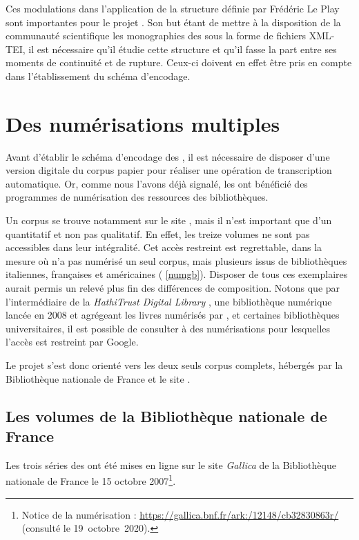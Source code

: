 Ces modulations dans l'application de la structure définie par Frédéric Le Play sont importantes pour le projet \timeus. Son but étant de mettre à la disposition de la communauté scientifique les monographies des \odm{} sous la forme de fichiers XML-TEI, il est nécessaire qu'il étudie cette structure et qu'il fasse la part entre ses moments de continuité et de rupture. Ceux-ci doivent en effet être pris en compte dans l'établissement du schéma d'encodage.

\newpage
\thispagestyle{empty}
\mbox{}
\newpage

\chapter{Des numérisations multiples}

Avant d'établir le schéma d'encodage des \odm, il est nécessaire de disposer d'une version digitale du corpus \og papier \fg{} pour réaliser une opération de transcription automatique. Or, comme nous l'avons déjà signalé, les \odm{} ont bénéficié des programmes de numérisation des ressources des bibliothèques.

Un corpus se trouve notamment sur le site \gb, mais il n'est important que d'un \pov{} quantitatif et non pas qualitatif. En effet, les treize volumes ne sont pas accessibles dans leur intégralité. Cet accès restreint est regrettable, dans la mesure où \gb{} n'a pas numérisé un seul corpus, mais plusieurs issus de bibliothèques italiennes, françaises et américaines (\ann{} \ref{numgb}). Disposer de tous ces exemplaires aurait permis un relevé plus fin des différences de composition. Notons que par l'intermédiaire de la \textit{HathiTrust Digital Library }, une bibliothèque numérique lancée en 2008 et agrégeant les livres numérisés par \gb, \ia{} et certaines bibliothèques universitaires, il est possible de consulter à des numérisations pour lesquelles l'accès est restreint par Google.

Le projet \timeus{} s'est donc orienté vers les deux seuls corpus complets, hébergés par la Bibliothèque nationale de France et le site \ia.

\section{Les volumes de la Bibliothèque nationale de France}

Les trois séries des \odm{} ont été mises en ligne sur le site \textit{Gallica} de la Bibliothèque nationale de France le 15 octobre 2007\footnote{Notice de la numérisation : \url{https://gallica.bnf.fr/ark:/12148/cb32830863r/} (consulté le 19~octobre~2020).}.

